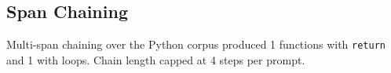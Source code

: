 \subsection{Span Chaining}
Multi-span chaining over the Python corpus produced 1 functions with \texttt{return} and
1 with loops. Chain length capped at 4 steps per prompt.
